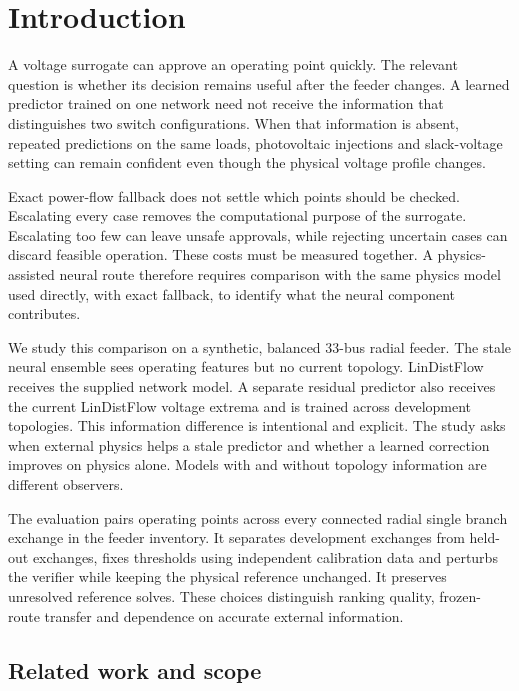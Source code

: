 \section{Introduction}
\label{sec:introduction}

A voltage surrogate can approve an operating point quickly. The relevant question is whether its decision remains useful after the feeder changes. A learned predictor trained on one network need not receive the information that distinguishes two switch configurations. When that information is absent, repeated predictions on the same loads, photovoltaic injections and slack-voltage setting can remain confident even though the physical voltage profile changes.

Exact power-flow fallback does not settle which points should be checked. Escalating every case removes the computational purpose of the surrogate. Escalating too few can leave unsafe approvals, while rejecting uncertain cases can discard feasible operation. These costs must be measured together. A physics-assisted neural route therefore requires comparison with the same physics model used directly, with exact fallback, to identify what the neural component contributes.

We study this comparison on a synthetic, balanced 33-bus radial feeder. The stale neural ensemble sees operating features but no current topology. LinDistFlow receives the supplied network model. A separate residual predictor also receives the current LinDistFlow voltage extrema and is trained across development topologies. This information difference is intentional and explicit. The study asks when external physics helps a stale predictor and whether a learned correction improves on physics alone. Models with and without topology information are different observers.

The evaluation pairs operating points across every connected radial single branch exchange in the feeder inventory. It separates development exchanges from held-out exchanges, fixes thresholds using independent calibration data and perturbs the verifier while keeping the physical reference unchanged. It preserves unresolved reference solves. These choices distinguish ranking quality, frozen-route transfer and dependence on accurate external information.

\subsection{Related work and scope}

